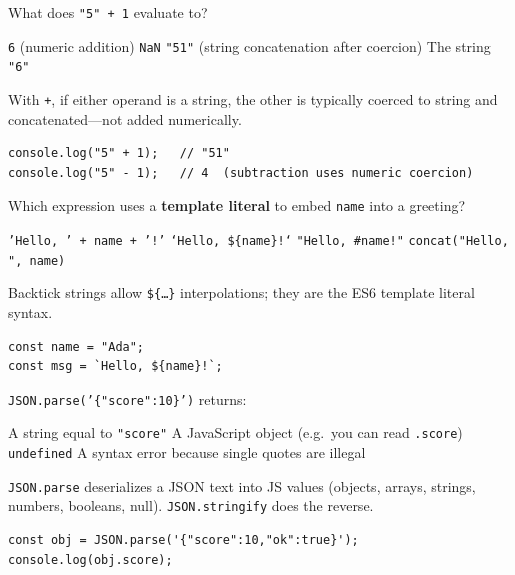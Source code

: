 \question[4]
What does \texttt{"5" + 1} evaluate to?
\begin{choices}
  \choice \texttt{6} (numeric addition)
  \choice \texttt{NaN}
  \CorrectChoice \texttt{"51"} (string concatenation after coercion)
  \choice The string \texttt{"6"}
\end{choices}
\begin{solution}
  With \texttt{+}, if either operand is a string, the other is typically coerced to string and concatenated---not added numerically.
\begin{lstlisting}[style=jsexam]
console.log("5" + 1);   // "51"
console.log("5" - 1);   // 4  (subtraction uses numeric coercion)
\end{lstlisting}
\end{solution}

\question[4]
Which expression uses a \textbf{template literal} to embed \texttt{name} into a greeting?
\begin{choices}
  \choice \texttt{'Hello, ' + name + '!'}
  \CorrectChoice \texttt{`Hello, \$\{name\}!`}
  \choice \texttt{"Hello, \#name!"}
  \choice \texttt{concat("Hello, ", name)}
\end{choices}
\begin{solution}
  Backtick strings allow \texttt{\$\{\ldots\}} interpolations; they are the ES6 template literal syntax.
\begin{lstlisting}[style=jsexam]
const name = "Ada";
const msg = `Hello, ${name}!`;
\end{lstlisting}
\end{solution}

\question[4]
\texttt{JSON.parse('\{"score":10\}')} returns:
\begin{choices}
  \choice A string equal to \texttt{"score"}
  \CorrectChoice A JavaScript object (e.g.\ you can read \texttt{.score})
  \choice \texttt{undefined}
  \choice A syntax error because single quotes are illegal
\end{choices}
\begin{solution}
  \texttt{JSON.parse} deserializes a JSON text into JS values (objects, arrays, strings, numbers, booleans, null). \texttt{JSON.stringify} does the reverse.
\begin{lstlisting}[style=jsexam]
const obj = JSON.parse('{"score":10,"ok":true}');
console.log(obj.score);
\end{lstlisting}
\end{solution}

